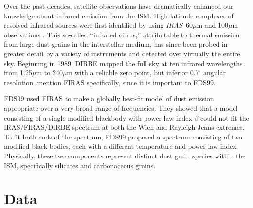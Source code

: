\documentclass{emulateapj}
\newcommand{\IRAS}{{\it IRAS}}
\begin{document}

Over the past decades, satellite observations have dramatically enhanced our
knowledge about infrared emission from the ISM. High-latitude complexes of 
resolved infrared sources were first identified by \cite{low84} using 
\IRAS~60$\mu$m and 100$\mu$m observations \citep{wheelock94}. This so-called 
``infrared cirrus,'' attributable to thermal emission from large dust grains in
the interstellar medium, has since been probed in greater detail by a variety 
of instruments and detected over virtually the entire sky. Beginning in 1989, 
DIRBE  mapped the full sky at ten infrared wavelengths from 1.25$\mu$m to 
240$\mu$m with a reliable zero point, but inferior 0.7$^{\circ}$ angular 
resolution \citep{boggess92}.mention FIRAS specifically, since it is important 
to FDS99.

FDS99 used FIRAS to make a globally best-fit model of dust emission 
appropriate over a very broad range of frequencies. They showed that a 
model consisting of a single modified blackbody with power law index $\beta$ 
could not fit the IRAS/FIRAS/DIRBE spectrum at both the Wien and 
Rayleigh-Jeans extremes. To fit both ends of the spectrum, FDS99 proposed
a spectrum consisting of two modified black bodies, each with a different
temperature and power law index. Physically, these two components
represent distinct dust grain species within the ISM, specifically 
silicates and carbonaceous grains.




\section{Data}
\end{document}
